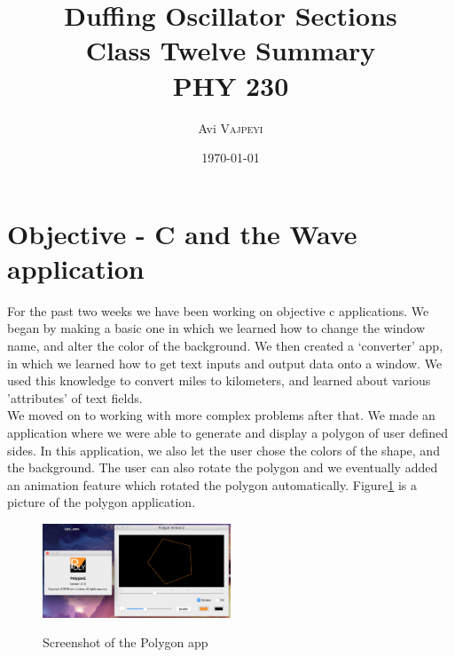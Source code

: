 \documentclass{article}
\title{Duffing Oscillator Sections\\ Class Twelve Summary\\ PHY 230} %
\author{Avi \textsc{Vajpeyi}} %
\date{\today} %
\begin{document}
\maketitle %





\section{Objective - C and the Wave application}

For the past two weeks we have been working on objective c applications. We began by making a basic one in which we learned how to change the window name, and alter the color of the background. We then created a `converter' app, in which we learned how to get text inputs and output data onto a window. We used this knowledge to convert miles to kilometers, and learned about various 'attributes' of text fields.\\

We moved on to working with more complex problems after that. We made an application where we were able to generate and display a polygon of user defined sides. In this application, we also let the user chose the colors of the shape, and the background. The user can also rotate the polygon and we eventually added an animation feature which rotated the polygon automatically. Figure\ref{poly} is a picture of the polygon application.\\


\begin{figure}[h]
	\caption{Screenshot of the Polygon app}
	\centering
	\includegraphics[width=0.5\textwidth]{poly} \label{poly}
\end{figure}
\end{document}
